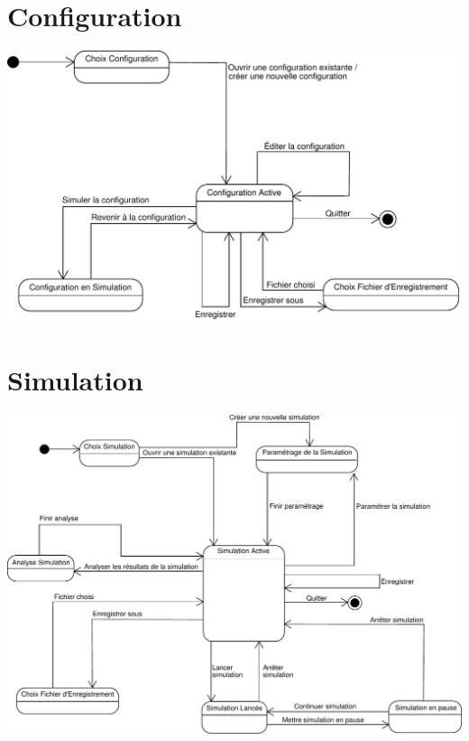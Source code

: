 \section{Configuration}
\begin{center}
\includegraphics[width=\textwidth]{../../DEC/Configuration.pdf}
\end{center}
\section{Simulation}
\begin{center}
\includegraphics[width=\textwidth]{../../DEC/Simulation.pdf}
\end{center}

